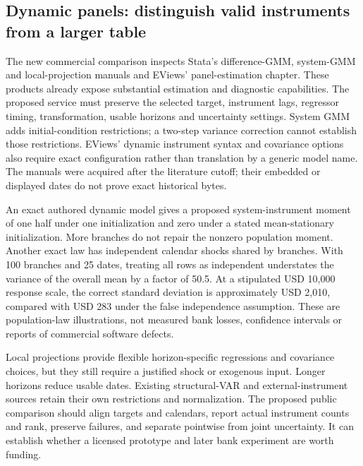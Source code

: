 \hypertarget{dynamic-panels-distinguish-valid-instruments-from-a-larger-table}{%
\subsection{Dynamic panels: distinguish valid instruments from a larger
table}\label{dynamic-panels-distinguish-valid-instruments-from-a-larger-table}}

The new commercial comparison inspects Stata's difference-GMM,
system-GMM and local-projection manuals and EViews' panel-estimation
chapter. These products already expose substantial estimation and
diagnostic capabilities. The proposed service must preserve the selected
target, instrument lags, regressor timing, transformation, usable
horizons and uncertainty settings. System GMM adds initial-condition
restrictions; a two-step variance correction cannot establish those
restrictions. EViews' dynamic instrument syntax and covariance options
also require exact configuration rather than translation by a generic
model name. The manuals were acquired after the literature cutoff; their
embedded or displayed dates do not prove exact historical bytes.
\citep{exec19_dynamic_stata_ab,exec19_dynamic_stata_system,
exec19_dynamic_stata_lp,exec19_dynamic_eviews_panel}

An exact authored dynamic model gives a proposed system-instrument
moment of one half under one initialization and zero under a stated
mean-stationary initialization. More branches do not repair the nonzero
population moment. Another exact law has independent calendar shocks
shared by branches. With 100 branches and 25 dates, treating all rows as
independent understates the variance of the overall mean by a factor of
50.5. At a stipulated USD 10,000 response scale, the correct standard
deviation is approximately USD 2,010, compared with USD 283 under the
false independence assumption. These are population-law illustrations,
not measured bank losses, confidence intervals or reports of commercial
software defects. \citep{exec19_dynamic_reference}

Local projections provide flexible horizon-specific regressions and
covariance choices, but they still require a justified shock or
exogenous input. Longer horizons reduce usable dates. Existing
structural-VAR and external-instrument sources retain their own
restrictions and normalization. The proposed public comparison should
align targets and calendars, report actual instrument counts and rank,
preserve failures, and separate pointwise from joint uncertainty. It can
establish whether a licensed prototype and later bank experiment are
worth funding. \citep{exec19_dynamic_stata_lp,
exec13_ct_stata_svar,exec13_ct_stata_ivsvar}

